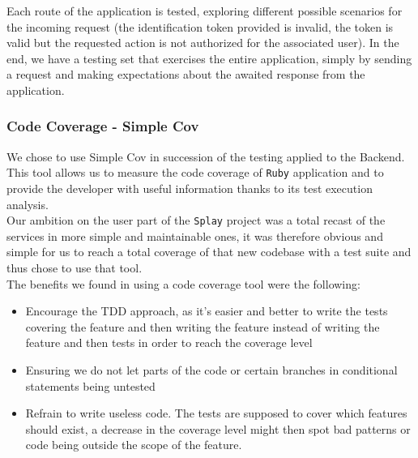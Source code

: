\documentclass{eplmastersthesis}
\begin{document}
          Each route of the application is tested, exploring different possible
          scenarios for the incoming request (the identification token provided
          is invalid, the token is valid but the requested action is not
          authorized for the associated user). In the end, we have a testing set
          that exercises the entire application, simply by sending a request and
          making expectations about the awaited response from the application.

        \subsubsection{Code Coverage - Simple Cov}

          We chose to use Simple Cov in succession of the testing applied to
          the Backend. This tool allows us to measure the code coverage of \texttt{Ruby}
          application and to provide the developer with useful information
          thanks to its test execution analysis.\\

          Our ambition on the user part of the \texttt{Splay} project was a total recast of
          the services in more simple and maintainable ones, it was therefore
          obvious and simple for us to reach a total coverage of that new codebase
          with a test suite and thus chose to use that tool.\\

          The benefits we found in using a code coverage tool were the
          following:

          \begin{itemize}
            \item Encourage the TDD approach, as it's easier and better to
            write the tests covering the feature and then writing the feature
            instead of writing the feature and then tests in order to reach
            the coverage level
            \item Ensuring we do not let parts of the code or certain branches
            in conditional statements being untested
            \item Refrain to write useless code. The tests are supposed to cover
            which features should exist, a decrease in the coverage level
            might then spot bad patterns or code being outside the scope
            of the feature.
          \end{itemize}
\end{document}
